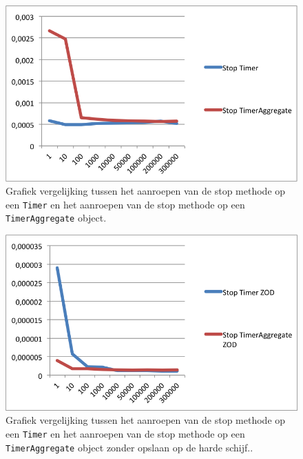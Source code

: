 \begin{figure}[!h]
  \centering
  \includegraphics[scale=1.0]{Afbeeldingen/Evaluatie/StopVSTimerAggregate}
  \caption{Grafiek vergelijking tussen het aanroepen van de stop methode op een \texttt{Timer} en het aanroepen van de stop methode op een \texttt{TimerAggregate} object.}
  \label{fig:StopVSTimerAggregate}
\end{figure}

\begin{figure}[!h]
  \centering
  \includegraphics[scale=1.0]{Afbeeldingen/Evaluatie/StopVSTimerAggregateZOD}
  \caption{Grafiek vergelijking tussen het aanroepen van de stop methode op een \texttt{Timer} en het aanroepen van de stop methode op een \texttt{TimerAggregate} object zonder opslaan op de harde schijf..}
  \label{fig:StopVSTimerAggregateZOD}
\end{figure}



